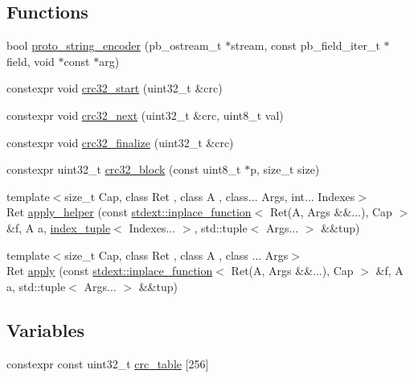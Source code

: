 \subsection*{Functions}
\begin{DoxyCompactItemize}
\item 
bool \hyperlink{namespacetelegen_1_1util_ad9294f759196bd321f5566036af85bf2}{proto\+\_\+string\+\_\+encoder} (pb\+\_\+ostream\+\_\+t $\ast$stream, const pb\+\_\+field\+\_\+iter\+\_\+t $\ast$field, void $\ast$const $\ast$arg)
\item 
constexpr void \hyperlink{namespacetelegen_1_1util_ae8b96d2bcf704fd8de4366ea725b54f7}{crc32\+\_\+start} (uint32\+\_\+t \&crc)
\item 
constexpr void \hyperlink{namespacetelegen_1_1util_a6724e747bbf9b75d4c08cf9a910b5d0f}{crc32\+\_\+next} (uint32\+\_\+t \&crc, uint8\+\_\+t val)
\item 
constexpr void \hyperlink{namespacetelegen_1_1util_a8955104562232d81e72279ab7a4787fe}{crc32\+\_\+finalize} (uint32\+\_\+t \&crc)
\item 
constexpr uint32\+\_\+t \hyperlink{namespacetelegen_1_1util_a8a5ff5e52e1ddc9e7872d27ecf1f12f7}{crc32\+\_\+block} (const uint8\+\_\+t $\ast$p, size\+\_\+t size)
\item 
{\footnotesize template$<$size\+\_\+t Cap, class Ret , class A , class... Args, int... Indexes$>$ }\\Ret \hyperlink{namespacetelegen_1_1util_ab05aef37c616f107c1b070178cabb28e}{apply\+\_\+helper} (const \hyperlink{classstdext_1_1inplace__function}{stdext\+::inplace\+\_\+function}$<$ Ret(A, Args \&\&...), Cap $>$ \&f, A a, \hyperlink{structtelegen_1_1util_1_1index__tuple}{index\+\_\+tuple}$<$ Indexes... $>$, std\+::tuple$<$ Args... $>$ \&\&tup)
\item 
{\footnotesize template$<$size\+\_\+t Cap, class Ret , class A , class ... Args$>$ }\\Ret \hyperlink{namespacetelegen_1_1util_a427fe35f9153460a301fe1e84598bfc7}{apply} (const \hyperlink{classstdext_1_1inplace__function}{stdext\+::inplace\+\_\+function}$<$ Ret(A, Args \&\&...), Cap $>$ \&f, A a, std\+::tuple$<$ Args... $>$ \&\&tup)
\end{DoxyCompactItemize}
\subsection*{Variables}
\begin{DoxyCompactItemize}
\item 
constexpr const uint32\+\_\+t \hyperlink{namespacetelegen_1_1util_acf354c2c0ec545191120b1f8628cb7d2}{crc\+\_\+table} \mbox{[}256\mbox{]}
\end{DoxyCompactItemize}


